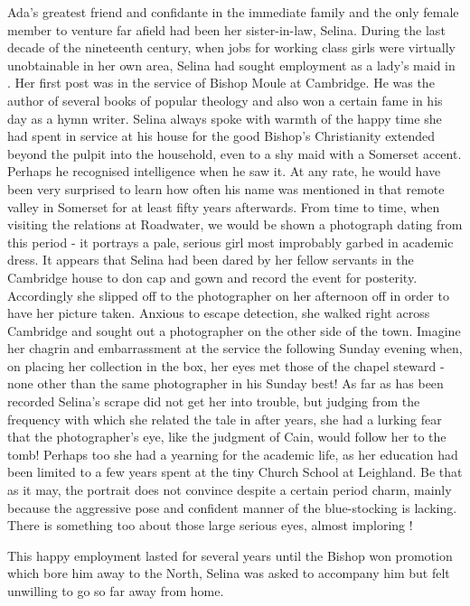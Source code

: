 Ada's greatest friend and confidante in the immediate family and the only female member to venture far afield had been her sister-in-law, Selina. During the last decade of the nineteenth century, when jobs for working class girls were virtually unobtainable in her own area, Selina had sought employment as a lady's maid in . Her first post was in the service of Bishop Moule at Cambridge. He was the author of several books of popular theology and also won a certain fame in his day as a hymn writer. Selina always spoke with warmth of the happy time she had spent in service at his house for the good Bishop's Christianity extended beyond the pulpit into the household, even to a shy maid with a Somerset accent. Perhaps he recognised intelligence when he saw it. At any rate, he would have been very surprised to learn how often his name was mentioned in that remote valley in Somerset for at least fifty years afterwards. From time to time, when visiting the relations at Roadwater, we would be shown a photograph dating from this period - it portrays a pale, serious girl most improbably garbed in academic dress. It appears that Selina had been dared by her fellow servants in the Cambridge house to don cap and gown and record the event for posterity. Accordingly she slipped off to the photographer on her afternoon off in order to have her picture taken. Anxious to escape detection, she walked right across Cambridge and sought out a photographer on the other side of the town. Imagine her chagrin and embarrassment at the service the following Sunday evening when, on placing her collection in the box, her eyes met those of the chapel steward -none other than the same photographer in his Sunday best! As far as has been recorded Selina’s scrape did not get her into trouble, but judging from the frequency with which she related the tale in after years, she had a lurking fear that the photographer's eye, like the judgment of Cain, would follow her to the tomb! Perhaps too she had a yearning for the academic life, as her education had been limited to a few years spent at the tiny Church School at Leighland. Be that as it may, the portrait does not convince despite a certain period charm, mainly because the aggressive pose and confident manner of the blue-stocking is lacking. There is something too about those large serious eyes, almost imploring !

This happy employment lasted for several years until the Bishop won promotion which bore him away to the North, Selina was asked to accompany him but felt unwilling to go so far away from home.

